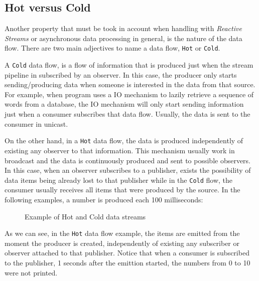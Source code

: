 	\subsection{Hot versus Cold}
	
	Another property that must be took in account when handling with \textit{Reactive Streams} or asynchronous data processing in general, is the nature of the data flow. 
	There are two main adjectives to name a data flow, \texttt{Hot} or \texttt{Cold}. 

	A \texttt{Cold} data flow, is a flow of information that is produced just when the stream pipeline in subscribed by an observer. In this case, the producer only starts sending/producing data when someone is interested in the data from that source. 
	For example, when program uses a IO mechanism to lazily retrieve a sequence of words from a database, the IO mechanism will only start sending information just when a consumer subscribes that data flow. Usually, the data is sent to the consumer in unicast.
	
	On the other hand, in a \texttt{Hot} data flow, the data is produced independently of existing any observer to that information. This mechanism usually work in broadcast and the data is continuously produced and sent to possible observers.
	In this case, when an observer subscribes to a publisher, exists the possibility of data items being already lost to that publisher while in the \texttt{Cold} flow, the consumer usually receives all items that were produced by the source.
	In the following examples, a number is produced each 100 milliseconds:

	\begin{figure}[H]
		\centering
		\begin{subfigure}[h]{1.2\textwidth}
			\centering
		 \end{subfigure}	
	\qquad\qquad
		 \begin{subfigure}[h]{1.2\textwidth}
			\centering
		\end{subfigure}		
	  \caption{Example of Hot and Cold data streams}
	  \label{fig:exmplo3}
	\end{figure}

	
	As we can see, in the \texttt{Hot} data flow example, the items are emitted from the moment the producer is created, independently of existing any subscriber or observer attached to that publisher. Notice that when a consumer is subscribed to the publisher, 1 seconds after the emittion started, the numbers from 0 to 10 were not printed.
	
